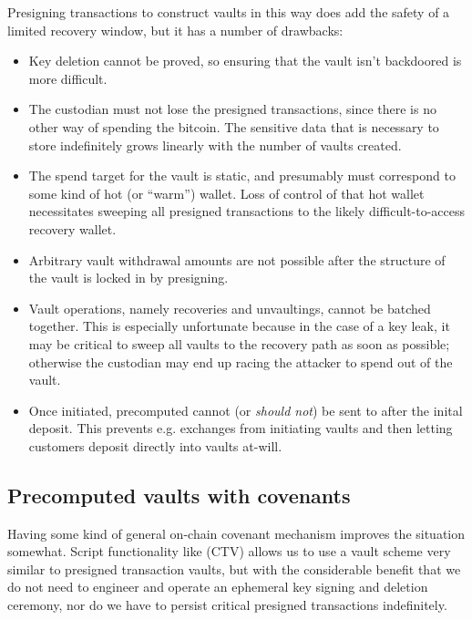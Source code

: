 \documentclass[10pt]{article}
\begin{document}
Presigning transactions to construct vaults in this way does add the safety of a
limited recovery window, but it has a number of drawbacks:

\begin{itemize}

  \item Key deletion cannot be proved, so ensuring that the vault isn't
    backdoored is more difficult.

  \item The custodian must not lose the presigned transactions, since there is no other
    way of spending the bitcoin. The sensitive data that is necessary to store
    indefinitely grows linearly with the number of vaults created.

  \item The spend target for the vault is static, and presumably must correspond to
    some kind of hot (or ``warm'') wallet. Loss of control of that hot wallet
    necessitates sweeping all presigned transactions to the likely difficult-to-access
    recovery wallet.

  \item Arbitrary vault withdrawal amounts are not possible after the structure of the
    vault is locked in by presigning.

  \item Vault operations, namely recoveries and unvaultings, cannot be batched together. This is
    especially unfortunate because in the case of a key leak, it may be
    critical to sweep all vaults to the recovery path as soon as possible; otherwise the
    custodian may end up racing the attacker to spend out of the vault.

  \item Once initiated, precomputed cannot (or \emph{should not}) be sent to after the
    inital deposit. This prevents e.g. exchanges from initiating vaults and then
    letting customers deposit directly into vaults at-will.

\end{itemize}


\subsection*{Precomputed vaults with covenants}

Having some kind of general on-chain covenant mechanism improves the situation
somewhat. Script functionality like \ctv{} (CTV) \cite{CTV} allows us to use a vault
scheme very similar to presigned transaction vaults, but with the considerable benefit
that we do not need to engineer and operate an ephemeral key signing and deletion
ceremony, nor do we have to persist critical presigned transactions indefinitely.
\end{document}
